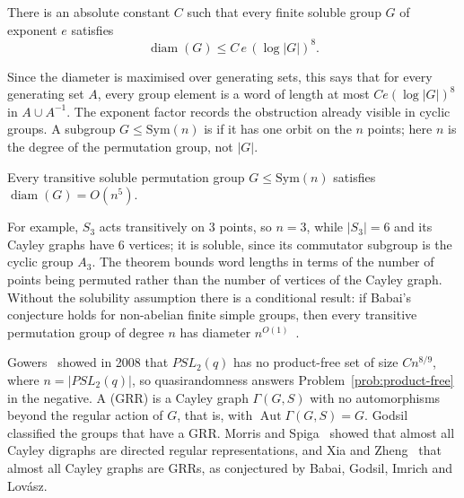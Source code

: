 \begin{theorem}\label{thm:emst}
There is an absolute constant $C$ such that every finite soluble group $G$ of exponent $e$ satisfies
\[
\operatorname{diam}(G)\leq C\,e\,(\log|G|)^8 .
\]
\end{theorem}

Since the diameter is maximised over generating sets, this says that for every generating set $A$, every group element is a word of length at most $Ce(\log|G|)^8$ in $A\cup A^{-1}$. The exponent factor records the obstruction already visible in cyclic groups. A subgroup $G\leq\mathrm{Sym}(n)$ is  if it has one orbit on the $n$ points; here $n$ is the degree of the permutation group, not $|G|$.

\begin{theorem}\label{thm:emst-transitive}
Every transitive soluble permutation group $G\leq\mathrm{Sym}(n)$ satisfies $\operatorname{diam}(G)=O(n^5)$.
\end{theorem}

For example, $S_3$ acts transitively on $3$ points, so $n=3$, while $|S_3|=6$ and its Cayley graphs have $6$ vertices; it is soluble, since its commutator subgroup is the cyclic group $A_3$. The theorem bounds word lengths in terms of the number of points being permuted rather than the number of vertices of the Cayley graph. Without the solubility assumption there is a conditional result: if Babai's conjecture holds for non-abelian finite simple groups, then every transitive permutation group of degree $n$ has diameter $n^{O(1)}$~\cite[Corollary~1.5]{emst26}.


Gowers~\cite{gow08} showed in 2008 that $PSL_2(q)$ has no product-free set of size $Cn^{8/9}$, where $n=|PSL_2(q)|$, so quasirandomness answers Problem~\ref{prob:product-free} in the negative. A  (GRR) is a Cayley graph $\Gamma(G,S)$ with no automorphisms beyond the regular action of $G$, that is, with $\operatorname{Aut}\Gamma(G,S)=G$. Godsil classified the groups that have a GRR. Morris and Spiga~\cite{ms18} showed that almost all Cayley digraphs are directed regular representations, and Xia and Zheng~\cite{xz22} that almost all Cayley graphs are GRRs, as conjectured by Babai, Godsil, Imrich and Lov\'asz.
